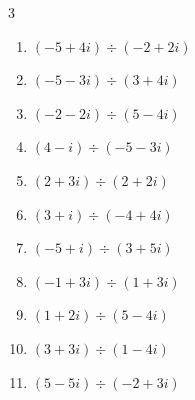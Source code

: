 \begin{multicols}{3}
\begin{enumerate}

\columnbreak %

  \item $\displaystyle (-5+4i)\div(-2+2i)$


  \item $\displaystyle (-5-3i)\div(3+4i)$


  \item $\displaystyle (-2-2i)\div(5-4i)$


  \item $\displaystyle (4-i)\div(-5-3i)$


  \item $\displaystyle (2+3i)\div(2+2i)$


  \item $\displaystyle (3+i)\div(-4+4i)$


  \item $\displaystyle (-5+i)\div(3+5i)$


  \item $\displaystyle (-1+3i)\div(1+3i)$


  \item $\displaystyle (1+2i)\div(5-4i)$


  \item $\displaystyle (3+3i)\div(1-4i)$


\columnbreak %

  \item $\displaystyle (5-5i)\div(-2+3i)$


\end{enumerate}
\end{multicols}
